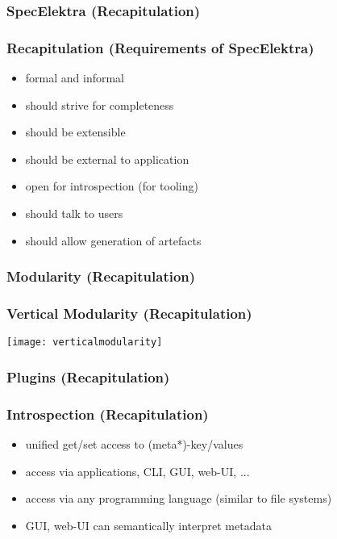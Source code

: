 \begin{frame}
	\frametitle{SpecElektra (Recapitulation)}
	\pause

	\fontsize{18}{0}\selectfont
\end{frame}

\begin{frame}
	\frametitle{Recapitulation (Requirements of SpecElektra)}

	\pause
	\begin{itemize}
	\item formal and informal
	\item should strive for completeness
	\item should be extensible
	\item should be external to application
	\item open for introspection (for tooling)
	\item should talk to users
	\item should allow generation of artefacts
	\end{itemize}
\end{frame}

\begin{frame}
	\frametitle{Modularity (Recapitulation)}
	\pause
	\Large
\end{frame}

\begin{frame}
	\frametitle{Vertical Modularity (Recapitulation)}
	\pause
	\texttt{[image: verticalmodularity]}
\end{frame}

\begin{frame}
	\frametitle{Plugins (Recapitulation)}
	\pause
	\Large
\end{frame}

\begin{frame}
	\frametitle{Introspection (Recapitulation)}
	\pause
	\begin{itemize}
	\item unified get/set access to (meta*)-key/values
	\item access via applications, CLI, GUI, web-UI, ...
	\item access via any programming language (similar to file systems)
	\item GUI, web-UI can semantically interpret metadata
	\end{itemize}
\end{frame}



